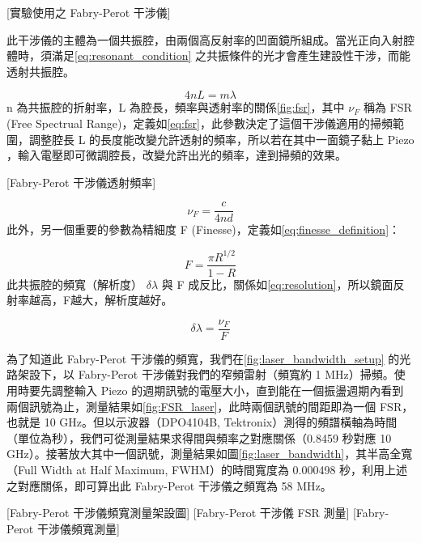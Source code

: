 \documentclass[class=NCU_thesis, crop=false]{standalone}
\begin{document}
[實驗使用之 Fabry-Perot 干涉儀]

此干涉儀的主體為一個共振腔，由兩個高反射率的凹面鏡所組成。當光正向入射腔體時，須滿足\cref{eq:resonant_condition} 之共振條件的光才會產生建設性干涉，而能透射共振腔。

\begin{equation}
    4nL=m\lambda
    \label{eq:resonant_condition}
\end{equation}
n 為共振腔的折射率，L 為腔長，頻率與透射率的關係\cref{fig:fsr}，其中 $\nu_{F}$ 稱為 FSR (Free Spectrual Range)，定義如\cref{eq:fsr}，此參數決定了這個干涉儀適用的掃頻範圍，調整腔長 L 的長度能改變允許透射的頻率，所以若在其中一面鏡子黏上 Piezo ，輸入電壓即可微調腔長，改變允許出光的頻率，達到掃頻的效果。

[Fabry-Perot 干涉儀透射頻率]

\begin{equation}
    \nu_{F}=\frac{c}{4nd}
    \label{eq:fsr}
\end{equation}
此外，另一個重要的參數為精細度 F (Finesse)，定義如\cref{eq:finesse_definition}：

\begin{equation}
    F=\frac{\pi R^{1/2}}{1-R}
    \label{eq:finesse_definition}
\end{equation}
此共振腔的頻寬（解析度） $\delta \lambda$ 與 F 成反比，關係如\cref{eq:resolution}，所以鏡面反射率越高，F越大，解析度越好。

\begin{equation}
    \delta \lambda=\frac{\nu_{F}}{F}
    \label{eq:resolution}
\end{equation}

為了知道此 Fabry-Perot 干涉儀的頻寬，我們在\cref{fig:laser_bandwidth_setup} 的光路架設下，以 Fabry-Perot 干涉儀對我們的窄頻雷射（頻寬約 1 MHz）掃頻。使用時要先調整輸入 Piezo 的週期訊號的電壓大小，直到能在一個振盪週期內看到兩個訊號為止，測量結果如\cref{fig:FSR_laser}，此時兩個訊號的間距即為一個 FSR，也就是 10 GHz。但以示波器（DPO4104B, Tektronix）測得的頻譜橫軸為時間（單位為秒），我們可從測量結果求得間與頻率之對應關係（0.8459 秒對應 10 GHz）。接著放大其中一個訊號，測量結果如圖\cref{fig:laser_bandwidth}，其半高全寬（Full Width at Half Maximum, FWHM）的時間寬度為 0.000498 秒，利用上述之對應關係，即可算出此 Fabry-Perot 干涉儀之頻寬為 58 MHz。

[Fabry-Perot 干涉儀頻寬測量架設圖]
[Fabry-Perot 干涉儀 FSR 測量]
[Fabry-Perot 干涉儀頻寬測量]
\end{document}
